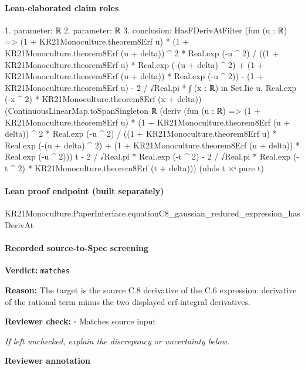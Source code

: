 \documentclass[10pt]{article}
\newcommand{\reviewerbox}{%
  \par\noindent\fbox{\parbox{0.96\linewidth}{\rule{0pt}{0.38in}}}\par
}
\newcommand{\reviewmatch}[1]{%
  \par\noindent\textbf{Reviewer check:} $\square$\; #1\par
  \noindent\emph{If left unchecked, explain the discrepancy or uncertainty below.}\par
}
\begin{document}
\paragraph{Lean-elaborated claim roles}\begin{ReviewVerbatim}
1. parameter: ℝ
2. parameter: ℝ
3. conclusion: HasFDerivAtFilter
  (fun (u : ℝ) =>
    (1 + KR21Monoculture.theorem8Erf u) * (1 + KR21Monoculture.theorem8Erf (u + delta)) ^ 2 * Real.exp (-u ^ 2) /
          ((1 + KR21Monoculture.theorem8Erf u) * Real.exp (-(u + delta) ^ 2) +
            (1 + KR21Monoculture.theorem8Erf (u + delta)) * Real.exp (-u ^ 2)) -
        (1 + KR21Monoculture.theorem8Erf u) -
      2 / √Real.pi * ∫ (x : ℝ) in Set.Iic u, Real.exp (-x ^ 2) * KR21Monoculture.theorem8Erf (x + delta))
  (ContinuousLinearMap.toSpanSingleton ℝ
    (deriv
          (fun (u : ℝ) =>
            (1 + KR21Monoculture.theorem8Erf u) * (1 + KR21Monoculture.theorem8Erf (u + delta)) ^ 2 *
                Real.exp (-u ^ 2) /
              ((1 + KR21Monoculture.theorem8Erf u) * Real.exp (-(u + delta) ^ 2) +
                (1 + KR21Monoculture.theorem8Erf (u + delta)) * Real.exp (-u ^ 2)))
          t -
        2 / √Real.pi * Real.exp (-t ^ 2) -
      2 / √Real.pi * Real.exp (-t ^ 2) * KR21Monoculture.theorem8Erf (t + delta)))
  (nhds t ×ˢ pure t)
\end{ReviewVerbatim}

\paragraph{Lean proof endpoint (built separately)}\begin{ReviewVerbatim}
KR21Monoculture.PaperInterface.equationC8_gaussian_reduced_expression_hasDerivAt
\end{ReviewVerbatim}

\paragraph{Recorded source-to-Spec screening}
\textbf{Verdict:} \texttt{matches}
\\
{\raggedright
\textbf{Reason:} The target is the source C.\allowbreak{}8 derivative of the C.\allowbreak{}6 expression:\allowbreak{} derivative of the rational term minus the two displayed erf-\allowbreak{}integral derivatives.\allowbreak{}
\par}
\reviewmatch{Matches source input}
\noindent\textbf{Reviewer annotation}\par
\reviewerbox
\clearpage
\hypertarget{source-claim-4139a609895b0de6}{}
\end{document}

